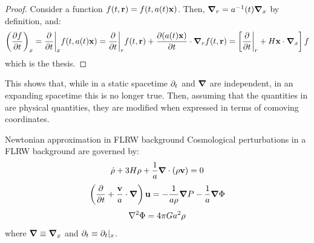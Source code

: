 \begin{proofbox}
  \begin{proof}
    Consider a function $ f(t,\mathbf{r}) = f(t,a(t)\mathbf{x}) $. Then, $ \boldsymbol{\nabla}_r = a^{-1}(t) \boldsymbol{\nabla}_x $ by definition, and:
    \begin{equation*}
      \left( \frac{\partial f}{\partial t} \right)_x = \frac{\partial}{\partial t} \bigg\vert_x f(t,a(t)\mathbf{x}) = \frac{\partial}{\partial t} \bigg\vert_r f(t,\mathbf{r}) + \frac{\partial (a(t) \mathbf{x})}{\partial t} \cdot \boldsymbol{\nabla}_r f(t,\mathbf{r}) = \left[ \frac{\partial}{\partial t} \bigg\vert_r + H \mathbf{x} \cdot \boldsymbol{\nabla}_x \right] f
    \end{equation*}
    which is the thesis.
  \end{proof}
\end{proofbox}

This shows that, while in a static spacetime $ \partial_t $ and $ \boldsymbol{\nabla} $ are independent, in an expanding spacetime this is no longer true. Then, assuming that the quantities in  are physical quantities, they are modified when expressed in terms of comoving coordinates.

\begin{theorem}{Newtonian approximation in FLRW background}{}
  Cosmological perturbations in a FLRW background are governed by:
  \begin{equation}
    \dot{\rho} + 3H \rho + \frac{1}{a} \boldsymbol{\nabla}\cdot (\rho \mathbf{v}) = 0
  \end{equation}
  \begin{equation}
    \left( \frac{\partial}{\partial t} + \frac{\mathbf{v}}{a} \cdot \boldsymbol{\nabla} \right) \mathbf{u} = - \frac{1}{a \rho} \boldsymbol{\nabla} P - \frac{1}{a} \boldsymbol{\nabla} \Phi
  \end{equation}
  \begin{equation}
    \nabla^2 \Phi = 4 \pi G a^2 \rho
  \end{equation}
  where $ \boldsymbol{\nabla} \equiv \boldsymbol{\nabla}_x $ and $ \partial_t \equiv \partial_t \vert_x $.
\end{theorem}

